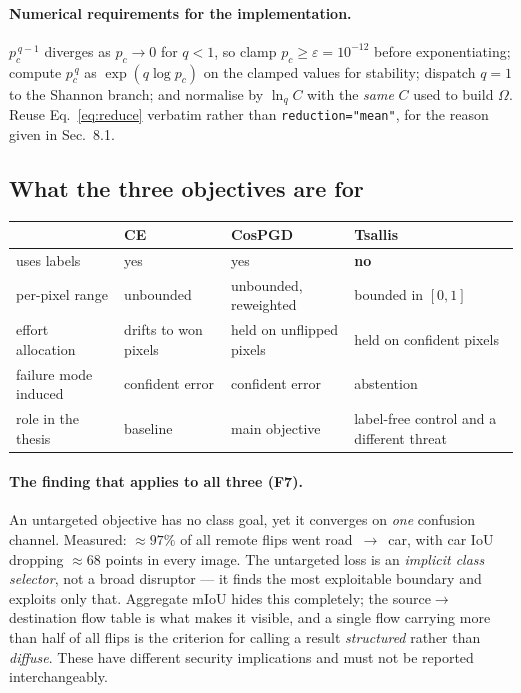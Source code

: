 \documentclass[11pt,a4paper]{article}
\begin{document}
\paragraph{Numerical requirements for the implementation.}
$p_c^{\,q-1}$ diverges as $p_c\to0$ for $q<1$, so clamp
$p_c\ge\varepsilon=10^{-12}$ before exponentiating; compute $p_c^{\,q}$ as
$\exp(q\log p_c)$ on the clamped values for stability; dispatch $q=1$ to the
Shannon branch; and normalise by $\ln_q C$ with the \emph{same} $C$ used to
build $\Omega$. Reuse Eq.~\eqref{eq:reduce} verbatim rather than
\texttt{reduction="mean"}, for the reason given in Sec.~8.1.

\subsection{What the three objectives are for}

\begin{center}
\small
\begin{tabular}{@{}lL{3.0cm}L{3.2cm}L{3.9cm}@{}}
\toprule
 & \textbf{CE} & \textbf{CosPGD} & \textbf{Tsallis} \\
\midrule
uses labels & yes & yes & \textbf{no} \\
per-pixel range & unbounded & unbounded, reweighted & bounded in $[0,1]$ \\
effort allocation & drifts to won pixels & held on unflipped pixels & held on confident pixels \\
failure mode induced & confident error & confident error & abstention \\
role in the thesis & baseline & main objective & label-free control and a different threat \\
\bottomrule
\end{tabular}
\end{center}

\paragraph{The finding that applies to all three (F7).}
An untargeted objective has no class goal, yet it converges on \emph{one}
confusion channel. Measured: $\approx97\%$ of all remote flips went
road~$\to$~car, with car IoU dropping $\approx68$ points in every image. The
untargeted loss is an \emph{implicit class selector}, not a broad
disruptor --- it finds the most exploitable boundary and exploits only that.
Aggregate mIoU hides this completely; the source$\to$destination flow table
is what makes it visible, and a single flow carrying more than half of all
flips is the criterion for calling a result \emph{structured} rather than
\emph{diffuse}. These have different security implications and must not be
reported interchangeably.
\end{document}
